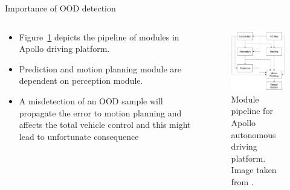 \documentclass[aspectratio=169]{beamer}
\begin{document}
\begin{frame}{Importance of OOD detection}
    \begin{columns}
       \begin{column}{0.5\textwidth}
        \begin{itemize}
            \item Figure~\ref{fig:eg_apollo_pipeline} depicts the pipeline of modules in Apollo driving platform.
            \item Prediction and motion planning module are dependent on perception module.
            \item A misdetection of an OOD sample will propagate the error to motion planning and affects the total vehicle control and this might lead to unfortunate consequence
        \end{itemize}
       \end{column}
       \begin{column}{0.5\textwidth}
            \begin{figure}
                \centering
                \includegraphics[scale=0.35]{images/apollo_pipeline.jpg}
                \caption{Module pipeline for Apollo autonomous driving platform. Image taken from \cite{baiduapollo}.}
                \label{fig:eg_apollo_pipeline}
            \end{figure}
       \end{column}
    \end{columns}
\end{frame}
\end{document}
